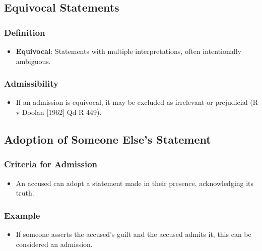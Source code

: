 \subsection{  Equivocal Statements}\label{equivocal-statements}

\subsubsection{Definition}\label{definition-3}

\begin{itemize}
\tightlist
\item
  \textbf{Equivocal}: Statements with multiple interpretations, often
  intentionally ambiguous.
\end{itemize}

\subsubsection{Admissibility}\label{admissibility}

\begin{itemize}
\tightlist
\item
  If an admission is equivocal, it may be excluded as irrelevant or
  prejudicial (R v Doolan {[}1962{]} Qd R 449).
\end{itemize}

\subsection{  Adoption of Someone Else's
Statement}\label{adoption-of-someone-elses-statement}

\subsubsection{Criteria for Admission}\label{criteria-for-admission-1}

\begin{itemize}
\tightlist
\item
  An accused can adopt a statement made in their presence, acknowledging
  its truth.
\end{itemize}

\subsubsection{Example}\label{example}

\begin{itemize}
\tightlist
\item
  If someone asserts the accused's guilt and the accused admits it, this
  can be considered an admission.
\end{itemize}

